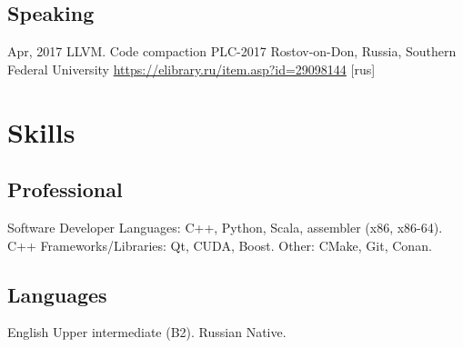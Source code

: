 \documentclass[11pt,a4paper]{moderncv}
\newcommand{\EngRus}[2]{#1}
\newcommand{\BirthPlaceOfValour}{\EngRus{Rostov-on-Don, Russia}{Ростов-на-Дону, Россия}}
\begin{document}
  \subsection{\EngRus{Speaking}{Конференции}}
    \cventry
      {\EngRus{Apr}{Апр}, 2017}
      {\EngRus{LLVM. Code compaction}{Преобразование по уплотнению кода в LLVM}}
      {\EngRus{PLC-2017}{Языки программирования и компиляторы 2017}}
      {\BirthPlaceOfValour, \EngRus{Southern Federal University}{Южный Федеральный Университет}}
      {\newline\url{https://elibrary.ru/item.asp?id=29098144} \EngRus{[rus]}{}}
      {}{}

\section{\EngRus{Skills}{Навыки}}
  \subsection{\EngRus{Professional}{Профессиональные}}
    \cvline
    {\EngRus{Software Developer}{Разработчик программного обеспечения}}
      {
      \EngRus{Languages}{Языки}: C++, Python, Scala, assembler (x86, x86-64).\newline{}
      \EngRus{C++ Frameworks/Libraries}{C++ Фреймворки/Библиотеки}: Qt, CUDA, Boost.\newline{}
      \EngRus{Other}{Другое}: CMake, Git, Conan.
      }
  \subsection{\EngRus{Languages}{Языки}}
    \cvline
    {\EngRus{English}{Английский}}
      {
      \EngRus{Upper intermediate}{Разговорный} (B2).
      }
    \cvline
    {\EngRus{Russian}{Русский}}
      {
      \EngRus{Native}{Носитель}.
      }
\end{document}
